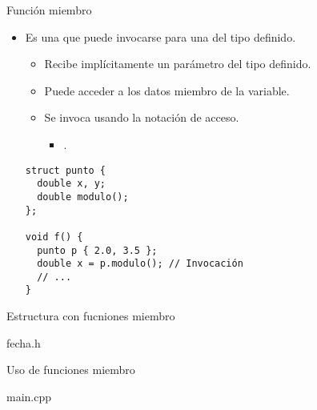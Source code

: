 \begin{frame}[fragile]{Función miembro}
\begin{itemize}
  \item Es una  que puede invocarse 
         para una  del tipo definido.
    \begin{itemize}
      \item Recibe implícitamente un parámetro del tipo definido.
      \item Puede acceder a los datos miembro de la variable.
      \item Se invoca usando la notación de acceso.
        \begin{itemize}
          \item {}.
        \end{itemize}
    \end{itemize}
\begin{lstlisting}
struct punto {
  double x, y;
  double modulo();
};

void f() {
  punto p { 2.0, 3.5 };
  double x = p.modulo(); // Invocación
  // ...
}
\end{lstlisting}
\end{itemize}
\end{frame}

\begin{frame}[t]{Estructura con fucniones miembro}
\begin{block}{fecha.h}

\end{block}
\end{frame}

\begin{frame}[t]{Uso de funciones miembro}
\begin{block}{main.cpp}

\end{block}
\end{frame}


